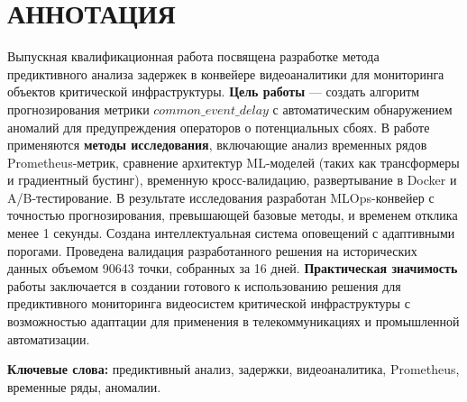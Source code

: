 \chapter*{АННОТАЦИЯ}

\hspace*{1.25cm}Выпускная квалификационная работа посвящена разработке метода предиктивного анализа задержек в конвейере видеоаналитики для мониторинга объектов критической инфраструктуры. \textbf{Цель работы} --- создать алгоритм прогнозирования метрики $common\_event\_delay$ с автоматическим обнаружением аномалий для предупреждения операторов о потенциальных сбоях. В работе применяются \textbf{методы исследования}, включающие анализ временных рядов Prometheus-метрик, сравнение архитектур ML-моделей (таких как трансформеры и градиентный бустинг), временную кросс-валидацию, развертывание в Docker и A/B-тестирование. В результате исследования разработан MLOps-конвейер с точностью прогнозирования, превышающей базовые методы, и временем отклика менее 1 секунды. Создана интеллектуальная система оповещений с адаптивными порогами. Проведена валидация разработанного решения на исторических данных объемом 90643 точки, собранных за 16 дней. \textbf{Практическая значимость} работы заключается в создании готового к использованию решения для предиктивного мониторинга видеосистем критической инфраструктуры с возможностью адаптации для применения в телекоммуникациях и промышленной автоматизации.

\vspace*{1cm}
\hspace*{1.25cm}\textbf{Ключевые слова:} предиктивный анализ, задержки, видеоаналитика, Prometheus, временные ряды, аномалии.

\newpage 